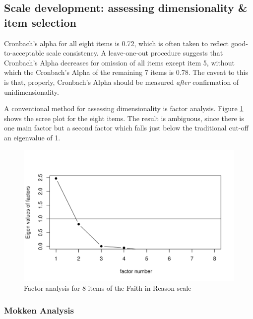 \documentclass[
  ,jou,floatsintext]{apa6}
\begin{document}
\hypertarget{scale-development-assessing-dimensionality-item-selection}{%
\subsection{Scale development: assessing dimensionality \& item selection}\label{scale-development-assessing-dimensionality-item-selection}}

Cronbach's alpha for all eight items is 0.72, which is often taken to reflect good-to-acceptable scale consistency. A leave-one-out procedure suggests that Cronbach's Alpha decreases for omission of all items except item 5, without which the Cronbach's Alpha of the remaining 7 items is 0.78. The caveat to this is that, properly, Cronbach's Alpha should be measured \emph{after} confirmation of unidimensionality.

A conventional method for assessing dimensionality is factor analysis. Figure \ref{fig:factor8} shows the scree plot for the eight items. The result is ambiguous, since there is one main factor but a second factor which falls just below the traditional cut-off an eigenvalue of 1.

\begin{figure}

{\centering \includegraphics[width=1\linewidth]{plots/reason_scree8} 

}

\caption{Factor analysis for 8 items of the Faith in Reason scale}\label{fig:factor8}
\end{figure}

\hypertarget{mokken-analysis}{%
\subsubsection{Mokken Analysis}\label{mokken-analysis}}
\end{document}
